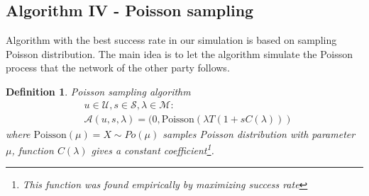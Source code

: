 \documentclass[twoside]{article}
\newtheorem{mydef}{Definition}
\begin{document}
\begin{multicols}{2}
\subsection{Algorithm IV - Poisson sampling}
Algorithm with the best success rate in our simulation is based on sampling Poisson distribution.
The main idea is to let the algorithm simulate the Poisson process that the network of the
other party follows. 

\begin{mydef}
Poisson sampling algorithm 
\begin{align*}
& u \in \mathcal{U}, s \in \mathcal{S}, \lambda \in \mathcal{M}:\\
& \mathcal{A}(u, s, \lambda) = (0, \text{Poisson}(\lambda T (1+s C(\lambda)))
\end{align*} where $\text{Poisson}(\mu) = X \sim Po(\mu)$ samples Poisson distribution with
parameter $\mu$, function $C(\lambda)$ gives a constant 
coefficient\footnote{This function was found empirically by maximizing success rate}.
\end{mydef}





\end{multicols}
\end{document}
